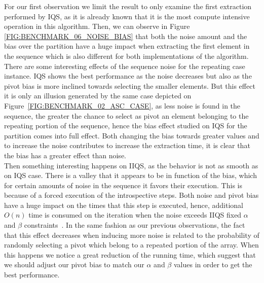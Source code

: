 For our first observation we limit the result to only examine the first extraction performed by IQS, as it is already known that it is the most compute intensive operation in this algorithm. Then, we can observe in Figure \ref{FIG:BENCHMARK_06_NOISE_BIAS} that both the noise amount and the bias over the partition have a huge impact when extracting the first element in the sequence which is also different for both implementations of the algorithm.\\

There are some interesting effects of the sequence noise for the repeating case instance. IQS shows the best performance as the noise decreases but also as the pivot bias is more inclined towards selecting the smaller elements. But this effect it is only an illusion generated by the same case depicted on Figure~\ref{FIG:BENCHMARK_02_ASC_CASE}, as less noise is found in the sequence, the greater the chance to select as pivot an element belonging to the repeating portion of the sequence, hence the bias effect studied on IQS for the partition comes into full effect. Both changing the bias towards greater values and to increase the noise contributes to increase the extraction time, it is clear that the bias has a greater effect than noise. \\

Then something interesting happens on IIQS, as the behavior is not as smooth as on IQS case. There is a valley that it appears to be in function of the bias, which for certain amounts of noise in the sequence it favors their execution. This is because of a forced execution of the introspective steps. Both noise and pivot bias have a huge impact on the times that this step is executed, hence, additional $O(n)$ time is consumed on the iteration when the noise exceeds IIQS fixed $\alpha$ and $\beta$ constraints~\cite{7416566}. In the same fashion as our previous observations, the fact that this effect decreases when inducing more noise is related to the probability of randomly selecting a pivot which belong to a repeated portion of the array. When this happens we notice a great reduction of the running time, which suggest that we should adjust our pivot bias to match our $\alpha$ and $\beta$ values in order to get the best performance.\\


